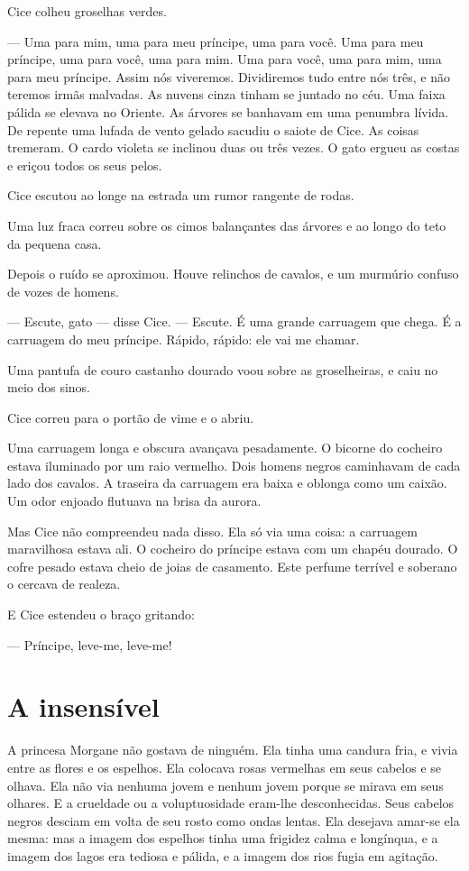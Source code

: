 Cice colheu groselhas verdes.

--- Uma para mim, uma para meu príncipe, uma para você. Uma para meu
príncipe, uma para você, uma para mim. Uma para você, uma para mim, uma
para meu príncipe. Assim nós viveremos. Dividiremos tudo entre nós três, e
não teremos irmãs malvadas.
\pagebreak
As nuvens cinza tinham se juntado no céu. Uma faixa pálida se elevava
no Oriente. As árvores se banhavam em uma penumbra lívida. De repente uma
lufada de vento gelado sacudiu o saiote de Cice. As coisas tremeram. O
cardo violeta se inclinou duas ou três vezes. O gato ergueu as costas e
eriçou todos os seus pelos.

Cice escutou ao longe na estrada um rumor rangente de rodas.

Uma luz fraca correu sobre os cimos balançantes das árvores e ao longo
do teto da pequena casa.

Depois o ruído se aproximou. Houve relinchos de cavalos, e um murmúrio
confuso de vozes de homens.

--- Escute, gato --- disse Cice.  --- Escute. É uma grande carruagem que chega.
É a carruagem do meu príncipe. Rápido, rápido: ele vai me chamar.

Uma pantufa de couro castanho dourado voou sobre as groselheiras, e
caiu no meio dos sinos.

Cice correu para o portão de vime e o abriu.

Uma carruagem longa e obscura avançava pesadamente. O bicorne do
cocheiro estava iluminado por um raio vermelho. Dois homens negros caminhavam
de cada lado dos cavalos. A traseira da carruagem era baixa e oblonga como
um caixão. Um odor enjoado flutuava na brisa da aurora.

Mas Cice não compreendeu nada disso. Ela só via uma coisa: a carruagem
maravilhosa estava ali. O cocheiro do príncipe estava com um chapéu
dourado. O cofre pesado estava cheio de joias de casamento. Este perfume
terrível e soberano o cercava de realeza.

E Cice estendeu o braço gritando:

--- Príncipe, leve-me, leve-me!

\section{A insensível}

A princesa Morgane não gostava de ninguém. Ela tinha uma candura fria,
e vivia entre as flores e os espelhos. Ela colocava rosas vermelhas em
seus cabelos e se olhava. Ela não via nenhuma jovem e nenhum jovem porque
se mirava em seus olhares. E a crueldade ou a voluptuosidade eram-lhe
desconhecidas. Seus cabelos negros desciam em volta de seu rosto como
ondas lentas. Ela desejava amar-se ela mesma: mas a imagem dos espelhos
tinha uma frigidez calma e longínqua, e a imagem dos lagos era tediosa e
pálida, e a imagem dos rios fugia em agitação.

